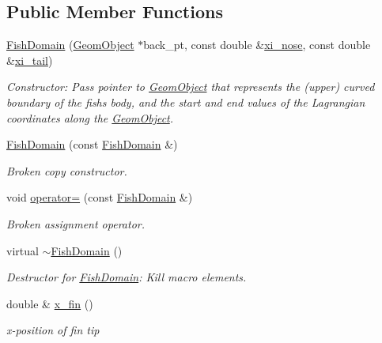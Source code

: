 \subsection*{Public Member Functions}
\begin{DoxyCompactItemize}
\item 
\hyperlink{classoomph_1_1FishDomain_a96f1e192900962ee55d063577822cd12}{Fish\+Domain} (\hyperlink{classoomph_1_1GeomObject}{Geom\+Object} $\ast$back\+\_\+pt, const double \&\hyperlink{classoomph_1_1FishDomain_a773b98977806c2b27531425ecf5e3f8e}{xi\+\_\+nose}, const double \&\hyperlink{classoomph_1_1FishDomain_ae2bcc0014506ba2225b928f319a27c9d}{xi\+\_\+tail})
\begin{DoxyCompactList}\small\item\em Constructor\+: Pass pointer to \hyperlink{classoomph_1_1GeomObject}{Geom\+Object} that represents the (upper) curved boundary of the fish\textquotesingle{}s body, and the start and end values of the Lagrangian coordinates along the \hyperlink{classoomph_1_1GeomObject}{Geom\+Object}. \end{DoxyCompactList}\item 
\hyperlink{classoomph_1_1FishDomain_a9436a46493f270e194b1cff950c6670e}{Fish\+Domain} (const \hyperlink{classoomph_1_1FishDomain}{Fish\+Domain} \&)
\begin{DoxyCompactList}\small\item\em Broken copy constructor. \end{DoxyCompactList}\item 
void \hyperlink{classoomph_1_1FishDomain_a87fdf6ae5c6d51e2dcd1aecb494ddaee}{operator=} (const \hyperlink{classoomph_1_1FishDomain}{Fish\+Domain} \&)
\begin{DoxyCompactList}\small\item\em Broken assignment operator. \end{DoxyCompactList}\item 
virtual \hyperlink{classoomph_1_1FishDomain_ab51c01c611efba9f940409e5154c9cd0}{$\sim$\+Fish\+Domain} ()
\begin{DoxyCompactList}\small\item\em Destructor for \hyperlink{classoomph_1_1FishDomain}{Fish\+Domain}\+: Kill macro elements. \end{DoxyCompactList}\item 
double \& \hyperlink{classoomph_1_1FishDomain_ae5343cbda69a625a56a7949edd43cad4}{x\+\_\+fin} ()
\begin{DoxyCompactList}\small\item\em x-\/position of fin tip \end{DoxyCompactList}\item 

\end{DoxyCompactItemize}
